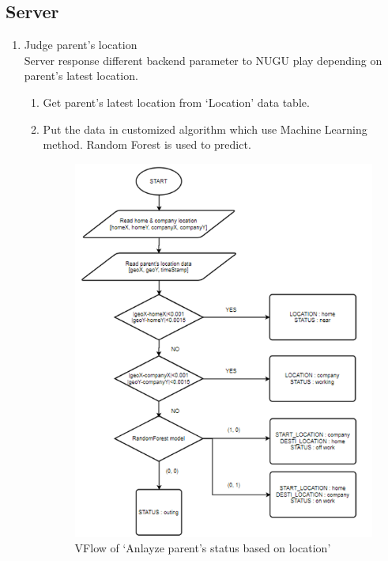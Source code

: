 \documentclass[conference]{IEEEtran}
\begin{document}
\subsection{Server}
\begin{enumerate}
    \item Judge parent’s location\\
    Server response different backend parameter to NUGU play depending on parent’s latest location.
    \begin{enumerate}
        \item Get parent’s latest location from ‘Location’ data table.
        \item Put the data in customized algorithm which use Machine Learning method. Random Forest is used to predict.
        
        \begin{figure}[htbp]
        \centerline{\includegraphics{images/f4.png}}
        \caption{VFlow of ‘Anlayze parent’s status based on location’}
        \end{figure}
        

\end{enumerate}
\end{enumerate}
\end{document}
